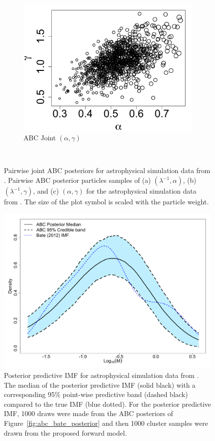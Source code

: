 \documentclass[12pt]{article}
\begin{document}
\begin{figure}[htbp]
\begin{subfigure}{0.32\textwidth}
\centering
\includegraphics[width = \textwidth]{figures/bate_joint_alpha_gamma.pdf} 
\caption{ABC Joint $(\alpha, \gamma)$}\label{subfig:joint_gamma_alpha_bate}
\end{subfigure} \\
\caption{
Pairwise joint ABC posteriors for astrophysical simulation data from \cite{Bate2012}.  Pairwise ABC posterior particles samples of (a) $(\lambda^{-1}, \alpha)$, (b) $(\lambda^{-1}, \gamma)$, and (c) $(\alpha, \gamma)$ for the astrophysical simulation data from \cite{Bate2012}.  The size of the plot symbol is scaled with the particle weight.
}
\label{fig:abc_bate_joints}
\end{figure}





\begin{figure}[htbp]
\centering
\includegraphics[width=.5\textwidth]{figures/bate_pred_imf.pdf}
 \caption{Posterior predictive IMF for astrophysical simulation data from \cite{Bate2012}. 
The median of the posterior predictive IMF (solid black) with a corresponding 95\% point-wise predictive band (dashed black) compared to the true IMF (blue dotted).  For the posterior predictive IMF, 1000 draws were made from the ABC posteriors of Figure~\ref{fig:abc_bate_posterior} and then 1000 cluster samples were drawn from the proposed forward model.  
} \label{fig:abc_bate_pred}
\end{figure}
\end{document}
